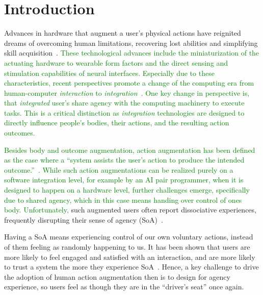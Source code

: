 \section{Introduction}
Advances in hardware that augment a user's physical actions have reignited dreams of overcoming human limitations, recovering lost abilities and simplifying skill acquisition~\citep{Goto2020-mw, Kunze2017-co}. \textcolor{green}{These technological advances include the miniaturization of the actuating hardware to wearable form factors and the direct sensing and stimulation capabilities of neural interfaces. Especially due to these characteristics, recent perspectives promote a change of the computing era from human-computer \textit{interaction} to \textit{integration}~\cite{Mueller2020-dl}. One key change in perspective is, that \textit{integrated} user's share agency with the computing machinery to execute tasks. This is a critical distinction as \textit{integration} technologies are designed to directly influence people’s bodies, their actions, and the resulting action outcomes.}

\textcolor{green}{Besides body and outcome augmentation, action augmentation has been defined as the case where a ``system assists the user’s action to produce the intended outcome.''~\cite{Cornelio2022-aq}. While such action augmentations can be realized purely on a software integration level, for example by an AI pair programmer, when it is designed to happen on a hardware level, further challenges emerge, specifically due to shared agency, which in this case means handing over control of ones body. Unfortunately,} such augmented users often report dissociative experiences, frequently disrupting their sense of agency (SoA)~\citep{Gilbert2017-ze, Gilbert2019-uc}.

Having a SoA means experiencing control of our own voluntary actions, instead of them feeling as randomly happening to us. It has been shown that users are more likely to feel engaged and satisfied with an interaction, and are more likely to trust a system the more they experience SoA~\citep{Berberian2012-do, Miller2007-rb}. Hence, a key challenge to drive the adoption of human action augmentation then is to design for agency experience, so users feel as though they are in the ``driver's seat'' once again.

